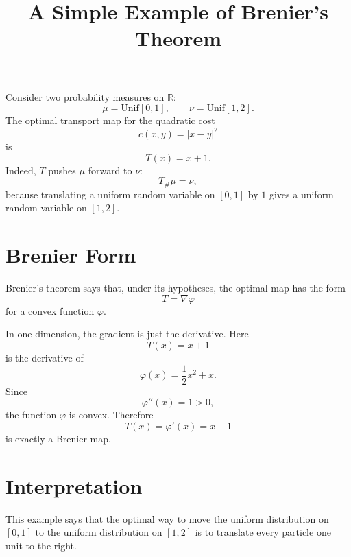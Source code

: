 \documentclass[11pt]{article}
\title{A Simple Example of Brenier's Theorem}
\author{}
\date{}
\begin{document}
\maketitle

Consider two probability measures on $\mathbb R$:
\[
\mu=\mathrm{Unif}[0,1],
\qquad
\nu=\mathrm{Unif}[1,2].
\]
The optimal transport map for the quadratic cost
\[
c(x,y)=|x-y|^2
\]
is
\[
T(x)=x+1.
\]
Indeed, $T$ pushes $\mu$ forward to $\nu$:
\[
T_\#\mu=\nu,
\]
because translating a uniform random variable on $[0,1]$ by $1$ gives a
uniform random variable on $[1,2]$.

\section*{Brenier Form}

Brenier's theorem says that, under its hypotheses, the optimal map has the form
\[
T=\nabla\varphi
\]
for a convex function $\varphi$.

In one dimension, the gradient is just the derivative. Here
\[
T(x)=x+1
\]
is the derivative of
\[
\varphi(x)=\frac12 x^2+x.
\]
Since
\[
\varphi''(x)=1>0,
\]
the function $\varphi$ is convex. Therefore
\[
T(x)=\varphi'(x)=x+1
\]
is exactly a Brenier map.

\section*{Interpretation}

This example says that the optimal way to move the uniform distribution on
$[0,1]$ to the uniform distribution on $[1,2]$ is to translate every particle
one unit to the right.
\end{document}
